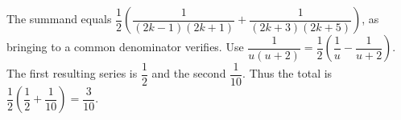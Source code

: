 The summand equals $\dfrac{1}{2}\left(\dfrac{1}{(2k-1)(2k+1)}+\dfrac{1}{(2k+3)(2k+5)}\right)$, as bringing to a common denominator verifies. Use $\dfrac{1}{u(u+2)}=\dfrac{1}{2}(\dfrac{1}{u}-\dfrac{1}{u+2})$. The first resulting series is $\dfrac{1}{2}$ and the second $\dfrac{1}{10}$. Thus the total is $\dfrac{1}{2}(\dfrac{1}{2}+\dfrac{1}{10})=\boxed{\dfrac{3}{10}}$.
